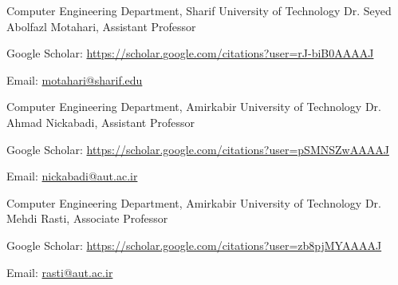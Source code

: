 

\begin{cventries}

  \cventry
    {Computer Engineering Department, Sharif University of Technology} %
    {Dr. Seyed Abolfazl Motahari, Assistant Professor} %
    {} %
    {} %
    {
      \begin{cvitems} %
        \item {Google Scholar: \href{https://scholar.google.com/citations?user=rJ-biB0AAAAJ&hl=en}{https://scholar.google.com/citations?user=rJ-biB0AAAAJ}}
        \item {Email: \href{mailto:motahari@sharif.edu}{motahari@sharif.edu}}
      \end{cvitems}
    }


  \cventry
    {Computer Engineering Department, Amirkabir University of Technology} %
    {Dr. Ahmad Nickabadi, Assistant Professor} %
    {} %
    {} %
    {
      \begin{cvitems} %
        \item {Google Scholar: \href{https://scholar.google.com/citations?user=pSMNSZwAAAAJ&hl=en}{https://scholar.google.com/citations?user=pSMNSZwAAAAJ}}
        \item {Email: \href{mailto:nickabadi@aut.ac.ir}{nickabadi@aut.ac.ir}}
      \end{cvitems}
    }

  \cventry
    {Computer Engineering Department, Amirkabir University of Technology} %
    {Dr. Mehdi Rasti, Associate Professor} %
    {} %
    {} %
    {
      \begin{cvitems} %
        \item {Google Scholar: \href{https://scholar.google.com/citations?user=zb8pjMYAAAAJ&hl=en}{https://scholar.google.com/citations?user=zb8pjMYAAAAJ}}
        \item {Email: \href{mailto:rasti@aut.ac.ir}{rasti@aut.ac.ir}}
      \end{cvitems}
    }


\end{cventries}
